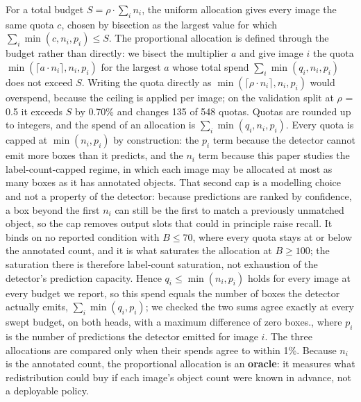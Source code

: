 \documentclass[sn-mathphys,Numbered]{sn-jnl}
\begin{document}
For a total budget $S = \rho\cdot{}\sum_i n_i$, the uniform allocation gives every image the same quota $c$, chosen by bisection as the largest value for which $\sum_i \min(c, n_i, p_i) \leq{} S$. The proportional allocation is defined through the budget rather than directly: we bisect the multiplier $a$ and give image $i$ the quota $\min(\lceil{}a\cdot{}n_i\rceil{}, n_i, p_i)$ for the largest $a$ whose total spend $\sum_i \min(q_i, n_i, p_i)$ does not exceed $S$. Writing the quota directly as $\min(\lceil{}\rho\cdot{}n_i\rceil{}, n_i, p_i)$ would overspend, because the ceiling is applied per image; on the validation split at $\rho$ = 0.5 it exceeds $S$ by 0.70\% and changes 135 of 548 quotas. Quotas are rounded up to integers, and the spend of an allocation is $\sum_i \min(q_i, n_i, p_i)$. Every quota is capped at $\min(n_i, p_i)$ by construction: the $p_i$ term because the detector cannot emit more boxes than it predicts, and the $n_i$ term because this paper studies the label-count-capped regime, in which each image may be allocated at most as many boxes as it has annotated objects. That second cap is a modelling choice and not a property of the detector: because predictions are ranked by confidence, a box beyond the first $n_i$ can still be the first to match a previously unmatched object, so the cap removes output slots that could in principle raise recall. It binds on no reported condition with $B \leq{} 70$, where every quota stays at or below the annotated count, and it is what saturates the allocation at $B \geq{} 100$; the saturation there is therefore label-count saturation, not exhaustion of the detector's prediction capacity. Hence $q_i \leq{} \min(n_i, p_i)$ holds for every image at every budget we report, so this spend equals the number of boxes the detector actually emits, $\sum_i \min(q_i, p_i)$; we checked the two sums agree exactly at every swept budget, on both heads, with a maximum difference of zero boxes., where $p_i$ is the number of predictions the detector emitted for image $i$. The three allocations are compared only when their spends agree to within 1\%. Because $n_i$ is the annotated count, the proportional allocation is an \textbf{oracle}: it measures what redistribution could buy if each image's object count were known in advance, not a deployable policy.
\end{document}
